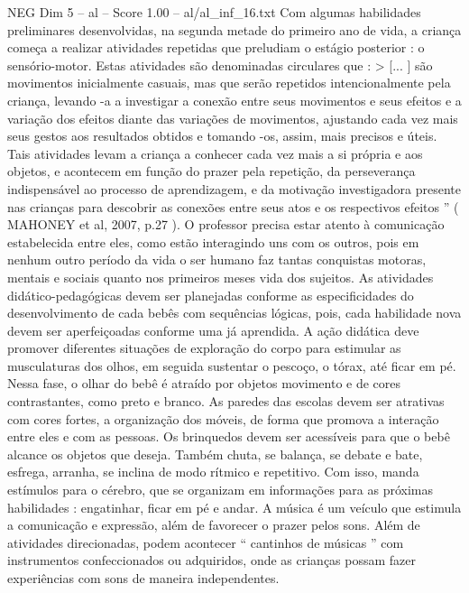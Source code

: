 \begin{textsample}{NEG Dim 5 – al – Score 1.00 – al/al\_inf\_16.txt}
Com algumas habilidades preliminares desenvolvidas, na segunda metade do primeiro ano de vida, a criança começa a realizar atividades repetidas que preludiam o estágio posterior : o sensório-motor.
Estas atividades são denominadas circulares que : > [... ] são movimentos inicialmente casuais, mas que serão repetidos intencionalmente pela criança, levando -a a investigar a conexão entre seus movimentos e seus efeitos e a variação dos efeitos diante das variações de movimentos, ajustando cada vez mais seus gestos aos resultados obtidos e tomando -os, assim, mais precisos e úteis.
Tais atividades levam a criança a conhecer cada vez mais a si própria e aos objetos, e acontecem em função do prazer pela repetição, da perseverança indispensável ao processo de aprendizagem, e da motivação investigadora presente nas crianças para descobrir as conexões entre seus atos e os respectivos efeitos ” ( MAHONEY et al, 2007, p.27 ).
O professor precisa estar atento à comunicação estabelecida entre eles, como estão interagindo uns com os outros, pois em nenhum outro período da vida o ser humano faz tantas conquistas motoras, mentais e sociais quanto nos primeiros meses vida dos sujeitos.
As atividades didático-pedagógicas devem ser planejadas conforme as especificidades do desenvolvimento de cada bebês com sequências lógicas, pois, cada habilidade nova devem ser aperfeiçoadas conforme uma já aprendida.
A ação didática deve promover diferentes situações de exploração do corpo para estimular as musculaturas dos olhos, em seguida sustentar o pescoço, o tórax, até ficar em pé.
Nessa fase, o olhar do bebê é atraído por objetos movimento e de cores contrastantes, como preto e branco.
As paredes das escolas devem ser atrativas com cores fortes, a organização dos móveis, de forma que promova a interação entre eles e com as pessoas.
Os brinquedos devem ser acessíveis para que o bebê alcance os objetos que deseja.
Também chuta, se balança, se debate e bate, esfrega, arranha, se inclina de modo rítmico e repetitivo.
Com isso, manda estímulos para o cérebro, que se organizam em informações para as próximas habilidades : engatinhar, ficar em pé e andar.
A música é um veículo que estimula a comunicação e expressão, além de favorecer o prazer pelos sons.
Além de atividades direcionadas, podem acontecer “ cantinhos de músicas ” com instrumentos confeccionados ou adquiridos, onde as crianças possam fazer experiências com sons de maneira independentes.

\end{textsample}
